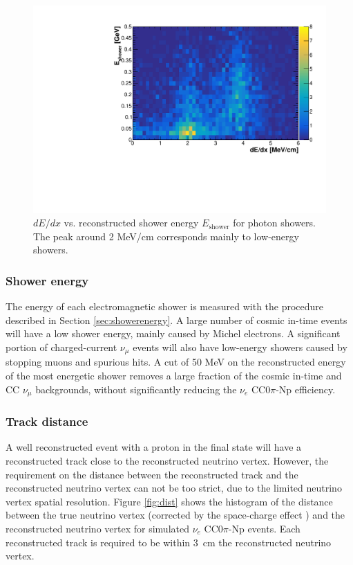 \begin{figure}[htbp]
\centering
  \includegraphics[width=0.7\linewidth]{figures/dedx_energy.pdf}
  \caption{$dE/dx$ vs. reconstructed shower energy $E_{\mathrm{shower}}$ for photon showers. The peak around 2 MeV/cm corresponds mainly to low-energy showers.}\label{fig:dedx_energy}
\end{figure}


\subsubsection{Shower energy}
The energy of each electromagnetic shower is measured with the procedure described in Section \ref{sec:showerenergy}. A large number of cosmic in-time events will have a low shower energy, mainly caused by Michel electrons. A significant portion of charged-current $\nu_{\mu}$ events will also have low-energy showers caused by stopping muons and spurious hits. A cut of 50 MeV on the reconstructed energy of the most energetic shower removes a large fraction of the cosmic in-time and CC $\nu_{\mu}$ backgrounds, without significantly reducing the $\nu_{e}$ CC0$\pi$-Np efficiency. 

\subsubsection{Track distance}
A well reconstructed event with a proton in the final state will have a reconstructed track close to the reconstructed neutrino vertex. However, the requirement on the distance between the reconstructed track and the reconstructed neutrino vertex can not be too strict, due to the limited neutrino vertex spatial resolution. Figure \ref{fig:dist} shows the histogram of the distance between the true neutrino vertex (corrected by the space-charge effect \cite{sce}) and the reconstructed neutrino vertex for simulated $\nu_{e}$ CC0$\pi$-Np events. Each reconstructed track is required to be within 3~cm the reconstructed neutrino vertex.

